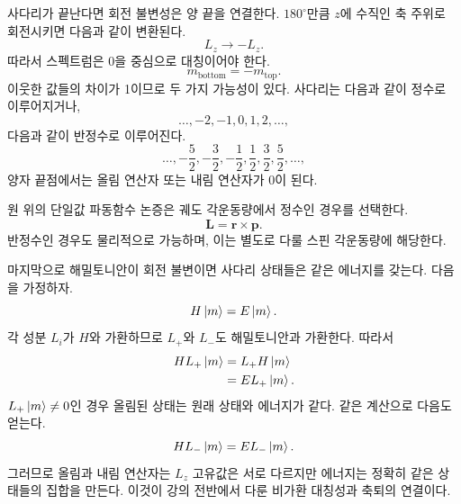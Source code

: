 \begin{classroomqa}
\end{classroomqa}

사다리가 끝난다면 회전 불변성은 양 끝을 연결한다. \(180^\circ\)만큼 \(z\)에 수직인 축 주위로 회전시키면 다음과 같이 변환된다.
\begin{equation}
L_z\longrightarrow-L_z.
\end{equation}
따라서 스펙트럼은 0을 중심으로 대칭이어야 한다.
\begin{equation}
m_{\mathrm{bottom}}=-m_{\mathrm{top}}.
\end{equation}
이웃한 값들의 차이가 1이므로 두 가지 가능성이 있다. 사다리는 다음과 같이 정수로 이루어지거나,
\begin{equation}
\ldots,-2,-1,0,1,2,\ldots,
\end{equation}
다음과 같이 반정수로 이루어진다.
\begin{equation}
\ldots,-\frac{5}{2},-\frac{3}{2},-\frac{1}{2},
\frac{1}{2},\frac{3}{2},\frac{5}{2},\ldots,
\end{equation}
양자 끝점에서는 올림 연산자 또는 내림 연산자가 0이 된다.

원 위의 단일값 파동함수 논증은 궤도 각운동량에서 정수인 경우를 선택한다.
\begin{equation}
\mathbf L=\mathbf r\times\mathbf p.
\end{equation}
반정수인 경우도 물리적으로 가능하며, 이는 별도로 다룰 스핀 각운동량에 해당한다.

마지막으로 해밀토니안이 회전 불변이면 사다리 상태들은 같은 에너지를 갖는다. 다음을 가정하자.
\begin{equation}
H\left\lvert m\right\rangle=E\left\lvert m\right\rangle.
\end{equation}
각 성분 \(L_i\)가 \(H\)와 가환하므로 \(L_+\)와 \(L_-\)도 해밀토니안과 가환한다. 따라서
\begin{align}
H L_+\left\lvert m\right\rangle
&=L_+H\left\lvert m\right\rangle\\
&=E L_+\left\lvert m\right\rangle.
\end{align}
\(L_+\left\lvert m\right\rangle\neq0\)인 경우 올림된 상태는 원래 상태와 에너지가 같다. 같은 계산으로 다음도 얻는다.
\begin{equation}
H L_-\left\lvert m\right\rangle=E L_-\left\lvert m\right\rangle.
\end{equation}
그러므로 올림과 내림 연산자는 \(L_z\) 고유값은 서로 다르지만 에너지는 정확히 같은 상태들의 집합을 만든다. 이것이 강의 전반에서 다룬 비가환 대칭성과 축퇴의 연결이다.

